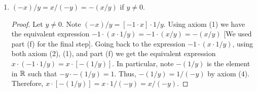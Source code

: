 \documentclass[12pt]{article}
\begin{document}
\begin{enumerate}[label=(\alph*)]
\begin{proof}
			Let $y \neq 0$. Note $(ax)/y = (ax) \cdot (1/y)$. Using axiom (1), this expression 
			is equivalent to $a(x \cdot 1/y) = a(x/y)$.
		\end{proof}
		\item $(-x)/y = x/(-y) = -(x/y)$ if $y \neq 0$.  
		\begin{proof}
			Let $y \neq 0$. Note $(-x)/y = [-1 \cdot x] \cdot 1/y$. Using axiom (1) we 
			have the equivalent expression $-1 \cdot (x \cdot 1/y) = -1 \cdot (x/y) = -(x/y)$ [We used part
			(f) for the final step]. Going back to the expression $-1 \cdot (x \cdot 1/y)$, using both
			axiom (2), (1), and part (f) we get the equivalent expression 
			$x \cdot (-1 \cdot 1/y) = x \cdot [-(1/y)]$. In particular, note $-(1/y)$ is the element in
			$\mathbb{R}$ such that $-y \cdot -(1/y) = 1$. Thus, $-(1/y) = 1/(-y)$ by axiom (4).
			Therefore, $x \cdot [-(1/y)] = x \cdot 1/(-y) = x/(-y)$.
		\end{proof}
	\end{enumerate}
	
\end{document}
